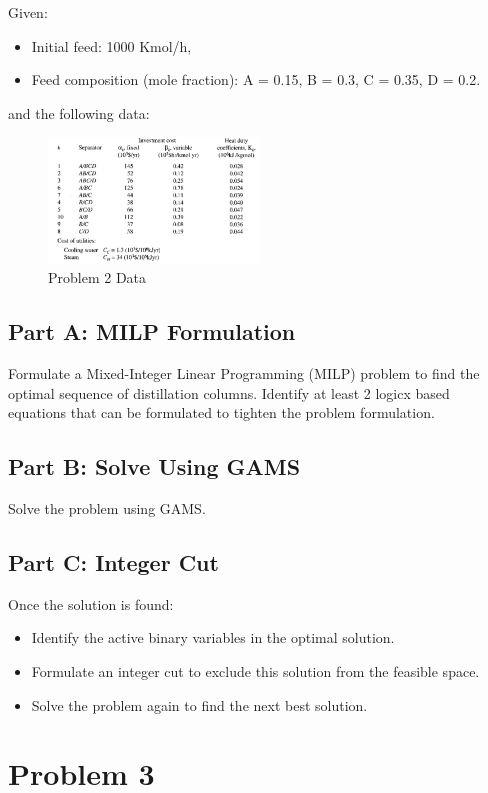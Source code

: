 \documentclass[11pt]{article}
\begin{document}
Given:
\begin{itemize}
  \item Initial feed: 1000 Kmol/h,
  \item Feed composition (mole fraction): A = 0.15, B = 0.3, C = 0.35, D = 0.2.
\end{itemize}
and the following data:
\begin{figure}[htbp]
  \centerline{\includegraphics[width=0.50\textwidth]{images/prob2_table.png}}
  \caption{Problem 2 Data}
  \label{fig:prob2_table}
\end{figure}

\subsection{Part A: MILP Formulation}
Formulate a Mixed-Integer Linear Programming (MILP) problem to find the optimal sequence of distillation columns. 
Identify at least 2 logicx based equations that can be formulated to tighten the problem formulation.


\subsection{Part B: Solve Using GAMS}
Solve the problem using GAMS.

\subsection{Part C: Integer Cut}
Once the solution is found:
\begin{itemize}
  \item Identify the active binary variables in the optimal solution.
  \item Formulate an integer cut to exclude this solution from the feasible space.
  \item Solve the problem again to find the next best solution.
\end{itemize}


\section{Problem 3}
\end{document}
